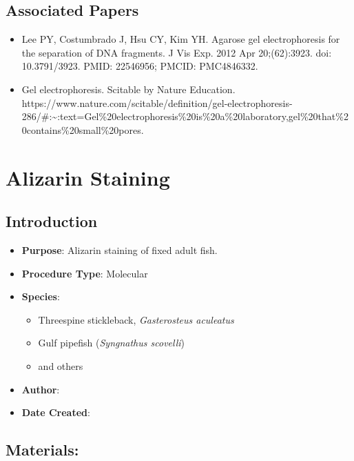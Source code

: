 \documentclass[
  letterpaper,
  DIV=11,
  numbers=noendperiod]{scrreprt}
\providecommand{\tightlist}{%
  \setlength{\itemsep}{0pt}\setlength{\parskip}{0pt}}\usepackage{longtable,booktabs,array}
\begin{document}
\hypertarget{associated-papers-11}{%
\section{Associated Papers}\label{associated-papers-11}}

\begin{itemize}
\tightlist
\item
  Lee PY, Costumbrado J, Hsu CY, Kim YH. Agarose gel electrophoresis for
  the separation of DNA fragments. J Vis Exp. 2012 Apr 20;(62):3923.
  doi: 10.3791/3923. PMID: 22546956; PMCID: PMC4846332.
\item
  Gel electrophoresis. Scitable by Nature Education.
  https://www.nature.com/scitable/definition/gel-electrophoresis-286/\#:\textasciitilde:text=Gel\%20electrophoresis\%20is\%20a\%20laboratory,gel\%20that\%20contains\%20small\%20pores.
\end{itemize}

\hypertarget{sec-molecular_alizarin}{%
\chapter{Alizarin Staining}\label{sec-molecular_alizarin}}

\hypertarget{introduction-17}{%
\section{Introduction}\label{introduction-17}}

\begin{itemize}
\tightlist
\item
  \textbf{Purpose}: Alizarin staining of fixed adult fish.
\item
  \textbf{Procedure Type}: Molecular
\item
  \textbf{Species}:

  \begin{itemize}
  \tightlist
  \item
    Threespine stickleback, \emph{Gasterosteus aculeatus}
  \item
    Gulf pipefish (\emph{Syngnathus scovelli})
  \item
    and others
  \end{itemize}
\item
  \textbf{Author}:
\item
  \textbf{Date Created}:
\end{itemize}

\hypertarget{materials-17}{%
\section{Materials:}\label{materials-17}}
\end{document}
